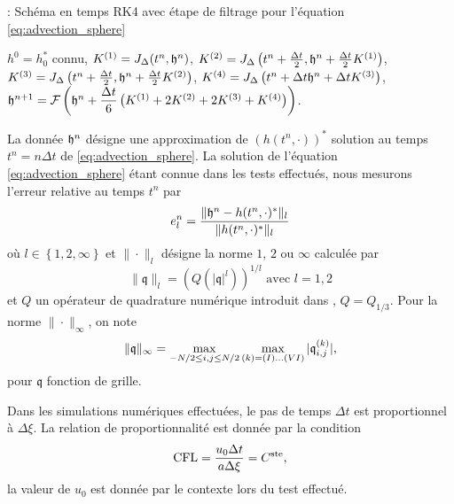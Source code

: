 \begin{center}
\begin{minipage}[H]{12cm}
  \begin{algorithm}[H]
    \caption{: Schéma en temps RK4 avec étape de filtrage pour l'équation \eqref{eq:advection_sphere} }\label{alg:RK4_transportSa}
    \begin{algorithmic}[1]
    \State $h^0 = h_0^*$ connu,
             \State  $K^{(1)} = J_{\Delta}(t^n, \mathfrak{h}^n)$,
             \State  $K^{(2)} = J_{\Delta}\left(t^n + \frac{\Delta t}{2}, \mathfrak{h}^n + \frac{\Delta t}{2} K^{(1)} \right)$,
             \State  $K^{(3)} = J_{\Delta}\left(t^n + \frac{\Delta t}{2}, \mathfrak{h}^n + \frac{\Delta t}{2} K^{(2)} \right)$,
             \State  $K^{(4)} = J_{\Delta}\left(t^n + \Delta t \mathfrak{h}^n + \Delta t K^{(3)} \right)$,  
             \State  $\mathfrak{h}^{n+1} = \mathcal{F}\left( \mathfrak{h}^n  + \dfrac{\Delta t}{6} \left( K^{(1)} + 2 K^{(2)} + 2 K^{(3)} + K^{(4)} \right) \right)$.
            \EndFor
    \end{algorithmic}
    \end{algorithm}
\end{minipage}
\end{center}

La donnée $\mathfrak{h}^n$ désigne une approximation de $(h(t^n,\cdot))^*$ solution au temps $t^n = n \Delta t$ de \eqref{eq:advection_sphere}.
La solution de l'équation \eqref{eq:advection_sphere} étant connue dans les tests effectués, nous mesurons l'erreur relative au temps $t^n$ par
\begin{equation}
e_l^n = \dfrac{\| \mathfrak{h}^n - h(t^n,\cdot)^* \|_l}{\| h(t^n,\cdot)^* \|_l}
\end{equation}
où $l \in \left\lbrace 1, 2, \infty \right\rbrace$ et $\| \cdot \|_l$ désigne la norme $1$, $2$ ou $\infty$ calculée par
\begin{equation}
\| \mathfrak{q} \|_l = \left( Q(|\mathfrak{q}|^l ) \right)^{1/l} \text{ avec } l=1,2
\end{equation}
et $Q$ un opérateur de quadrature numérique introduit dans \cite{Portelenelle2018}, $Q= Q_{1/3}$. Pour la norme $\| \cdot \|_{\infty}$, on note
\begin{equation}
\|  \mathfrak{q} \|_{\infty} = \max_{-N/2 \leq i,j \leq N/2} \max_{(k) = (I) ... (VI)} |\mathfrak{q}_{i,j}^{(k)}|,
\end{equation}
pour $\mathfrak{q}$ fonction de grille.

Dans les simulations numériques effectuées, le pas de temps $\Delta t$ est proportionnel à $\Delta \xi$. La relation de proportionnalité est donnée par la condition
\begin{equation}
\text{CFL} = \dfrac{u_0 \Delta t}{a \Delta \xi} =C^{\text{ste}},
\end{equation}
la valeur de $u_0$ est donnée par le contexte lors du test effectué.















